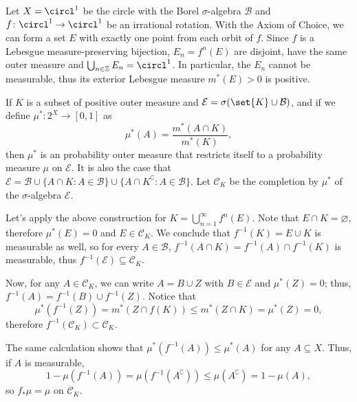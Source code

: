 \documentclass[../main]{subfiles}
\begin{document}
\begin{example}
  Let \(X = \circl^1\) be the circle with the Borel \(\sigma\)-algebra \(\mathcal{B}\) and \(f \colon \circl^1 \to \circl^1\) be an irrational rotation. With the Axiom of Choice, we can form a set \(E\) with exactly one point from each orbit of \(f\). Since \(f\) is a Lebesgue measure-preserving bijection, \(E_n = f^n(E)\) are disjoint, have the same outer measure and \(\bigcup_{n \in \mathbb{Z}} E_n = \circl^1\). In particular, the \(E_n\) cannot be measurable, thus its exterior Lebesgue measure \(m^*(E) > 0\) is positive.

  If \(K\) is a subset of positive outer measure and \(\mathcal{E} = \sigma(\set{K} \cup \mathcal{B})\), and if we define \(\mu^* \colon 2^X \to [0,1]\) as
  \[\mu^*(A) = \frac{m^*(A \cap K)}{m^*(K)},\]
  then \(\mu^*\) is an probability outer measure that restricts itself to a probability measure \(\mu\) on \(\mathcal{E}\). It is also the case that \(\mathcal{E} = \mathcal{B} \cup \{ A \cap K : A \in \mathcal{B} \} \cup \{ A \cap K^{\complement} : A \in \mathcal{B} \}\). Let \(\mathcal{C}_K\) be the completion by \(\mu^*\) of the \(\sigma\)-algebra \(\mathcal{E}\).

  Let's apply the above construction for \(K = \bigcup_{n = 1}^{\infty}f^{n}(E)\). Note that \(E \cap K = \varnothing\), therefore \(\mu^*(E) = 0\) and \(E \in \mathcal{C}_K\). We conclude that \(f^{-1}(K) = E \cup K\) is measurable as well, so for every \(A \in \mathcal{B}\), \(f^{-1}(A \cap K) = f^{-1}(A) \cap f^{-1}(K)\) is measurable, thus \(f^{-1}(\mathcal{E}) \subseteq \mathcal{C}_K\).

  Now, for any \(A \in \mathcal{C}_K\), we can write \(A = B \cup Z\) with \(B \in \mathcal{E}\) and \(\mu^*(Z) = 0\); thus, \(f^{-1}(A) = f^{-1}(B) \cup f^{-1}(Z)\). Notice that
  \begin{equation*}
    \mu^*(f^{-1}(Z)) = m^*(Z \cap f(K)) \leq m^*(Z \cap K) = \mu^*(Z) = 0,
  \end{equation*}
  therefore \(f^{-1}(\mathcal{C}_K) \subset \mathcal{C}_K\).

  The same calculation shows that \(\mu^*(f^{-1}(A)) \leq \mu^*(A)\) for any \(A \subseteq X\). Thus, if \(A\) is measurable,
  \begin{equation*}
    1 - \mu(f^{-1}(A)) = \mu(f^{-1}(A^{\complement})) \leq \mu(A^{\complement}) = 1 - \mu(A),
  \end{equation*}
  so \(f_*\mu = \mu\) on \(\mathcal{C}_K\).


\end{example}
\end{document}
